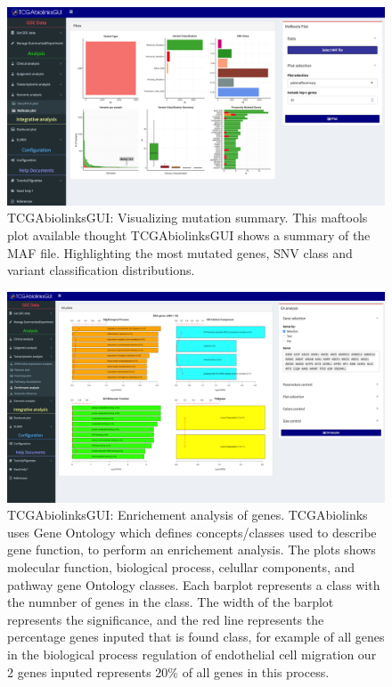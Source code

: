 \begin{figure}
\includegraphics[width=1.0\linewidth]{images/maftools_summary.png}
\caption[TCGAbiolinksGUI: Visualizing mutation summary]{TCGAbiolinksGUI: Visualizing mutation summary. This maftools plot available thought TCGAbiolinksGUI shows a summary of the MAF file. Highlighting the most mutated genes, SNV class and variant classification distributions. }
\label{fig:maftoools_summary}
\end{figure}


\begin{figure}
\includegraphics[width=1.0\linewidth]{images/gui_ea.png}
\caption[TCGAbiolinksGUI: Enrichement analysis of genes]{TCGAbiolinksGUI: Enrichement analysis of genes.
 TCGAbiolinks uses Gene Ontology which defines concepts/classes used to describe gene function, to perform an enrichement analysis. The plots shows  molecular function, biological process, celullar components, and pathway gene Ontology classes.
 Each barplot represents a class with the numnber of genes in the class. The width of the barplot represents the significance, and the red line represents the percentage genes inputed that is found class, for example of all genes in the biological process regulation of endothelial cell migration our 2 genes inputed represents 20\% of all genes in this process.}
\label{fig:gui_ea}
\end{figure}


